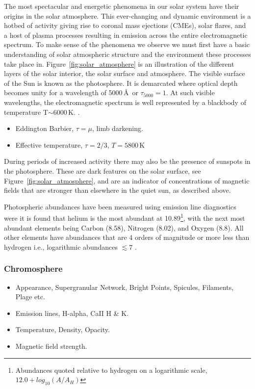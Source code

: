 The most spectacular and energetic phenomena in our solar system have their origins in the solar atmosphere. This ever-changing and dynamic environment is a hotbed of activity giving rise to coronal mass ejections (CMEs), solar flares, and a host of plasma processes resulting in emission across the entire electromagnetic spectrum. To make sense of the phenomena we observe we must first have a basic understanding of solar atmospheric structure and the environment these processes take place in. Figure~\ref{fig:solar_atmosphere} is an illustration of the different layers of the solar interior, the solar surface and atmosphere. The visible surface of the Sun is known as the photosphere. It is demarcated where optical depth becomes unity for a wavelength of 5000\,\AA\ or $\tau_{5000}=1$. At such visible wavelengths, the electromagnetic spectrum is well represented by a blackbody of temperature T$\sim$6000\,K. .

\begin{itemize}
\item Eddington Barbier, $\tau=\mu$, limb darkening.
\item Effective temperature, $\tau=2/3$, $T=5800$\,K
\end{itemize}

During periods of increased activity there may also be the presence of sunspots in the photosphere. These are dark features on the solar surface, see Figure~\ref{fig:solar_atmosphere}, and are an indicator of concentrations of magnetic fields that are stronger than elsewhere in the quiet sun, as described above. 

Photospheric abundances have been measured using emission line diagnostics were it is found that helium is the most abundant at 10.89\footnote{Abundances quoted relative to hydrogen on a logarithmic scale, $12.0+log_{10}(A/A_H)$}, with the next most abundant elements being Carbon (8.58), Nitrogen (8.02), and Oxygen (8.8). All other elements have abundances that are 4 orders of magnitude or more less than hydrogen i.e., logarithmic abundances $\lesssim7$ \citep{phillips2008}.

\subsubsection{Chromosphere}\label{sec:122}

\begin{itemize}
\item Appearance, Supergranular Network, Bright Points, Spicules, Filaments, Plage etc.
\item Emission lines, H-alpha, CaII H \& K. 
\item Temperature, Density, Opacity.
\item Magnetic field strength.
\end{itemize}

